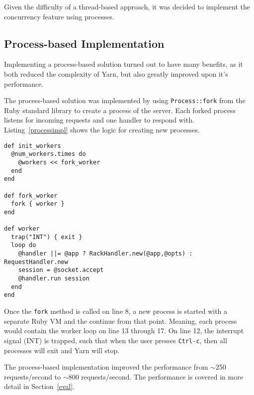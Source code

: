 Given the difficulty of a thread-based approach, it was decided to implement
the concurrency feature using processes.

\subsection{Process-based Implementation}
Implementing a process-based solution turned out to have many benefits, as it
both reduced the complexity of Yarn, but also greatly improved upon it's
performance.

The process-based solution was implemented by using \texttt{Process::fork}
from the Ruby standard library to create a process of the server. Each forked
process listens for incoming requests and one handler to respond with.
Listing~\ref{processimpl} shows the logic for creating new processes.

\bigskip
\begin{lstlisting}[label=processimpl,caption=Process-based implementation (lib/yarn/server.rb:52)]
def init_workers
  @num_workers.times do
    @workers << fork_worker
  end
end

def fork_worker
  fork { worker }
end

def worker
  trap("INT") { exit }
  loop do
    @handler ||= @app ? RackHandler.new(@app,@opts) : RequestHandler.new
    session = @socket.accept
    @handler.run session 
  end
end
\end{lstlisting}

Once the \texttt{fork} method is called on line 8, a new process is started
with a separate Ruby VM and the continue from that point. Meaning, each
process would contain the worker loop on line 13 through 17. On line 12, the
interrupt signal (INT) is trapped, such that when the user presses
\texttt{Ctrl-c}, then all processes will exit and Yarn will stop. 

The process-based implementation improved the performance from $\sim$250
requests/second to $\sim$800 requests/second. The performance is covered in
more detail in Section~\ref{eval}.

